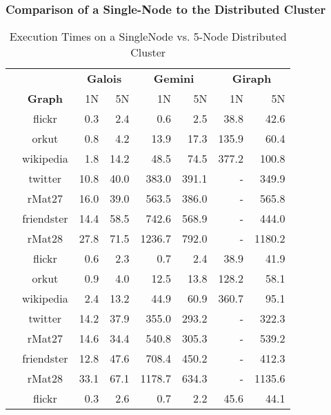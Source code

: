 





\subsubsection{Comparison of a Single-Node to the Distributed Cluster}
\begin{table}
	\caption{Execution Times on a SingleNode vs. 5-Node Distributed Cluster}
	\label{tbl:SSSP_execTimeComparison}
	\renewcommand{\arraystretch}{1.2}
	\centering
	\begin{tabular}{ccr@{\tabskip 1 \tabcolsep}r
	r@{\tabskip 1 \tabcolsep}r
	r@{\tabskip 1 \tabcolsep}r}
		\toprule
		&&\multicolumn{2}{c}{\bf Galois}&\multicolumn{2}{c}{\bf Gemini}&\multicolumn{2}{c}{\bf Giraph}\\
		\cmidrule{3-4}\cmidrule{5-6}\cmidrule{7-8}
		&\bf Graph&1N&5N&1N&5N&1N&5N\\
		\midrule
		\multirow{7}{0.5ex}{\rotatebox{90}{\bf SSSP}}&flickr & 0.3 & 2.4 & 0.6 & 2.5 & 38.8 & 42.6 \\
		& orkut & 0.8 & 4.2 & 13.9 & 17.3 & 135.9 & 60.4 \\
		& wikipedia & 1.8 & 14.2 & 48.5 & 74.5 & 377.2 & 100.8 \\
		& twitter & 10.8 & 40.0 & 383.0 & 391.1 & - & 349.9 \\
		& rMat27 & 16.0 & 39.0 & 563.5 & 386.0 & - & 565.8 \\
		& friendster & 14.4 & 58.5 & 742.6 & 568.9 & - & 444.0 \\
		& rMat28 & 27.8 & 71.5 & 1236.7 & 792.0 & - & 1180.2 \\
		\midrule
		\multirow{7}{0.5ex}{\rotatebox{90}{\bf BFS}}& flickr & 0.6 & 2.3 & 0.7 & 2.4 & 38.9 & 41.9 \\
		& orkut & 0.9 & 4.0 & 12.5 & 13.8 & 128.2 & 58.1 \\
		& wikipedia & 2.4 & 13.2 & 44.9 & 60.9 & 360.7 & 95.1 \\
		& twitter & 14.2 & 37.9 & 355.0 & 293.2 & - & 322.3 \\
		& rMat27 & 14.6 & 34.4 & 540.8 & 305.3 & - & 539.2 \\
		& friendster & 12.8 & 47.6 & 708.4 & 450.2 & - & 412.3 \\
		& rMat28 & 33.1 & 67.1 & 1178.7 & 634.3 & - & 1135.6 \\
		\midrule
		\multirow{7}{0.5ex}{\rotatebox{90}{\bf PR}}& flickr & 0.3\txtdagger & 2.6 & 0.7 & 2.2 & 45.6 & 44.1 \\

\end{tabular}
\end{table}
